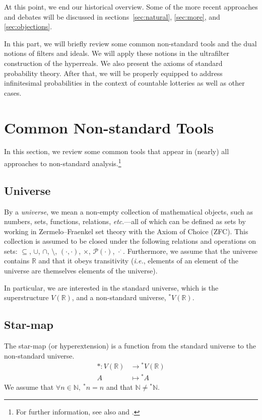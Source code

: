 At this point, we end our historical overview. Some of the more recent approaches and debates will be discussed in sections~\ref{sec:natural}, \ref{sec:more}, and \ref{sec:objections}.

\newpage
{}
In this part, we will briefly review some common non-standard tools and the dual notions of filters and ideals. We will apply these notions in the ultrafilter construction of the hyperreals. We also present the axioms of standard probability theory. After that, we will be properly equipped to address infinitesimal probabilities in the context of countable lotteries as well as other cases.

\section{Common Non-standard Tools}\label{sec:commonNStools}

In this section, we review some common tools that appear in (nearly) all approaches to non-standard analysis.\footnote{For further information, see also \citet[section~1]{Benci_etal:2006a} and \citet[section~1.2]{Cutland:1983}.}

\subsection{Universe}
By a \textit{universe}, we mean a non-empty collection of mathematical objects, such as numbers, sets, functions, relations, \textit{etc}.---all of which can be defined as sets by working in Zermelo--Fraenkel set theory with the Axiom of Choice (ZFC). This collection is assumed to be closed under the following relations and operations on sets: $\subseteq$, $\cup$, $\cap$, $\setminus$, $(\cdot,\cdot)$, $\times$, $\mathcal{P}(\cdot)$, $\cdot^\cdot$.
Furthermore, we assume that the universe contains $\mathbb{R}$ and that it obeys transitivity (\textit{i.e.}, elements of an element of the universe are themselves elements of the universe).

In particular, we are interested in the standard universe, which is the superstructure $V(\mathbb{R})$, and a non-standard universe, ${^\ast V}(\mathbb{R})$.

\subsection{Star-map}
The star-map (or hyperextension) is a function from the standard universe to the non-standard universe.
$$
\begin{aligned}
\ast : V(\mathbb{R}) &\rightarrow {^\ast V}(\mathbb{R})\\
	    A &\mapsto {^\ast A}
\end{aligned}
$$
We assume that $\forall n \in \mathbb{N}, \ {^\ast n}=n$ and that $\mathbb{N} \neq {^\ast \mathbb{N}}$.

